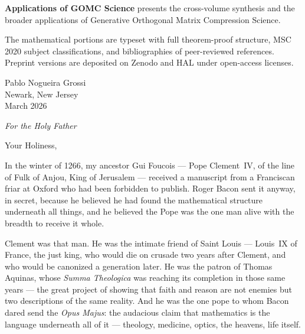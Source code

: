 \documentclass[12pt, oneside]{book}
\theoremstyle{plain}
\theoremstyle{definition}
\theoremstyle{remark}
\begin{document}
\textbf{Applications of GOMC Science} presents the cross-volume synthesis and
the broader applications of Generative Orthogonal Matrix Compression Science.

The mathematical portions are typeset with full theorem-proof structure, MSC 2020
subject classifications, and bibliographies of peer-reviewed references. Preprint
versions are deposited on Zenodo and HAL under open-access licenses.

\bigskip
\begin{flushright}
Pablo Nogueira Grossi\\
Newark, New Jersey\\
March 2026
\end{flushright}

\cleardoublepage

\tableofcontents
\cleardoublepage

\mainmatter

\newpage
\thispagestyle{empty}
\vspace*{2.2cm}
\begin{center}
{\large\textit{For the Holy Father}}
\end{center}
\vspace{1.4cm}
\noindent Your Holiness,
\vspace{0.5cm}

\noindent In the winter of 1266, my ancestor Gui Foucois ---
Pope Clement~IV, of the line of Fulk of Anjou,
King of Jerusalem --- received a manuscript from
a Franciscan friar at Oxford who had been forbidden
to publish. Roger Bacon sent it anyway, in secret,
because he believed he had found the mathematical
structure underneath all things, and he believed
the Pope was the one man alive with the breadth
to receive it whole.

\vspace{0.4cm}
\noindent Clement was that man. He was the intimate friend
of Saint Louis --- Louis~IX of France, the just king,
who would die on crusade two years after Clement,
and who would be canonized a generation later.
He was the patron of Thomas Aquinas, whose
\textit{Summa Theologica} was reaching its completion
in those same years --- the great project of showing
that faith and reason are not enemies but two descriptions
of the same reality. And he was the one pope to whom
Bacon dared send the \textit{Opus Majus}: the audacious
claim that mathematics is the language underneath all of
it --- theology, medicine, optics, the heavens, life itself.
\end{document}
